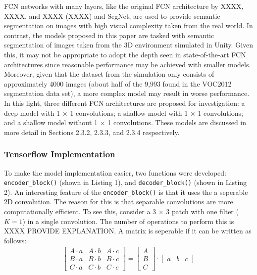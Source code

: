 \documentclass[a4paper]{article}
\begin{document}
FCN networks with many layers, like the original FCN architecture by XXXX, XXXX, and XXXX (XXXX) and SegNet, are used to provide semantic segmentation on images with high visual complexity taken from the real world. In contrast, the models proposed in this paper are tasked with semantic segmentation of images taken from the 3D environment simulated in Unity. Given this, it may not be appropriate to adopt the depth seen in state-of-the-art FCN architectures since reasonable performance may be achieved with smaller models. Moreover, given that the dataset from the simulation only consists of approximately 4000 images (about half of the 9,993 found in the VOC2012 segmentation data set), a more complex model may result in worse performance. In this light, three different FCN architectures are proposed for investigation: a deep model with 1 $\times$ 1 convolutions; a shallow model with 1 $\times$ 1 convolutions; and a shallow model without 1 $\times$ 1 convolutions. These models are discussed in more detail in Sections 2.3.2, 2.3.3, and 2.3.4 respectively. 

\subsubsection{Tensorflow Implementation}
To make the model implementation easier, two functions were developed: \verb|encoder_block()| (shown in Listing 1), and \verb|decoder_block()| (shown in Listing 2). An interesting feature of the \verb|encoder_block()| is that it uses the a seperable 2D convolution. The reason for this is that separable convolutions are more computationally efficient. To see this, consider a 3 $\times$ 3 patch with one filter ($K = 1$) in a single convolution. The number of operations to perform this is XXXX PROVIDE EXPLANATION. A matrix is seperable if it can be written as follows:
\begin{align}
\begin{bmatrix}
A \cdot a & A \cdot b & A \cdot c\\
B \cdot a & B \cdot b & B \cdot c\\
C \cdot a & C \cdot b & C \cdot c
\end{bmatrix}
=
\begin{bmatrix}
A\\
B\\
C
\end{bmatrix}
\cdot
\begin{bmatrix}
a & b & c
\end{bmatrix}
\end{align}  
\end{document}
